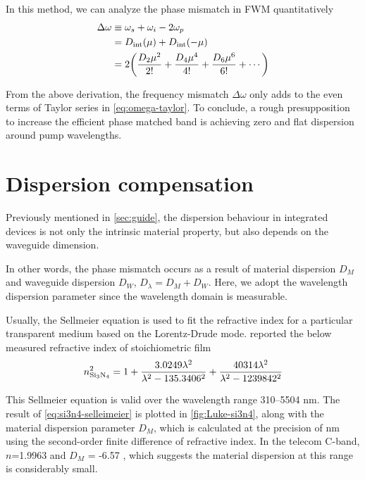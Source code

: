 In this method, we can analyze the phase mismatch in FWM quantitatively
\begin{align}\label{eq:freq-mismatch}
	\Delta \omega &\equiv \omega_s + \omega_i - 2 \omega_p \\
	&= D_\mathrm{int}(\mu) + D_\mathrm{int}(-\mu) \nonumber \\
	&= 2\qty(\frac{D_2 \mu^2}{2!} + \frac{D_4 \mu^4}{4!} + \frac{D_6 \mu^6}{6!} +\cdots)  \nonumber
\end{align}

From the above derivation, the frequency mismatch $ \Delta\omega $ only adds to the even terms of Taylor series in \autoref{eq:omega-taylor}.
To conclude, a rough presupposition to increase the efficient phase matched band is achieving zero and flat dispersion around pump wavelengths.

\section{Dispersion compensation}\label{sec:disp-comp}
Previously mentioned  in \autoref{sec:guide}, the dispersion behaviour in integrated devices is not only the intrinsic material property, but also depends on the waveguide dimension. 

In other words, the phase mismatch occurs as a result of material dispersion $D_M$ and waveguide dispersion $ D_W $, $D_{\lambda}= D_M + D_W$. Here, we adopt the wavelength dispersion parameter since the wavelength domain is measurable.

Usually, the Sellmeier equation is used to fit the refractive index for a particular transparent medium based on the Lorentz-Drude mode. \citeauthor{Luke2015a} reported the below measured refractive index of stoichiometric  film \cite{Luke2015a}
\begin{equation}\label{eq:si3n4-selleimeier}
    n_{\ce{Si3N4}}^2 = 1 + \frac{3.0249 \lambda^2}{\lambda^2-135.3406^2} + \frac{40314 \lambda^2}{\lambda^2 - 1239842^2}
\end{equation}

This Sellmeier equation is valid over the wavelength range 310–5504 \si{\nm}.
The result of \autoref{eq:si3n4-selleimeier} is plotted in \autoref{fig:Luke-si3n4}, along with the material dispersion parameter $D_M$, which is calculated at the precision of \si{\nm} using the second-order finite difference of refractive index. In the telecom C-band, $n$=1.9963 and $D_M$ = -6.57 \dispu, which suggests the material dispersion at this range is considerably small.

